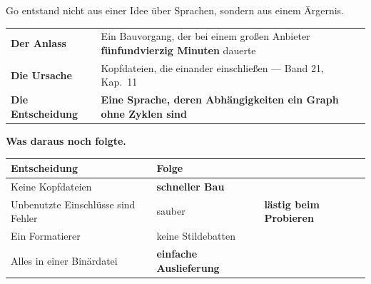 \begin{geschichte}
Go entstand nicht aus einer Idee über Sprachen, sondern aus einem Ärgernis.

\begin{center}
\renewcommand{\arraystretch}{1.5}
\begin{tabular}{@{}P{2.6cm}P{6.4cm}@{}}
\toprule
\textbf{Der Anlass} & Ein Bauvorgang, der bei einem großen Anbieter \textbf{fünfundvierzig Minuten} dauerte\\
\textbf{Die Ursache} & Kopfdateien, die einander einschließen --- Band 21, Kap.~11\\
\textbf{Die Entscheidung} & \textbf{Eine Sprache, deren Abhängigkeiten ein Graph ohne Zyklen sind}\\
\bottomrule
\end{tabular}
\end{center}

\begin{center}
\begin{minipage}{0.86\textwidth}
\end{minipage}
\end{center}

\textbf{Was daraus noch folgte.}

\begin{center}
\renewcommand{\arraystretch}{1.5}
\begin{tabular}{@{}P{3.0cm}P{2.4cm}P{2.6cm}@{}}
\toprule
\textbf{Entscheidung} & \textbf{Folge} & \\
\midrule
Keine Kopfdateien & \textcolor{gruen}{\textbf{schneller Bau}} & \\
Unbenutzte Einschlüsse sind Fehler & \textcolor{gruen}{sauber} & \textcolor{akzent}{\textbf{lästig beim Probieren}}\\
Ein Formatierer & \textcolor{gruen}{keine Stildebatten} & \\
Alles in einer Binärdatei & \textcolor{gruen}{\textbf{einfache Auslieferung}} & \\
\bottomrule
\end{tabular}
\end{center}

\begin{center}
\begin{minipage}{0.86\textwidth}
\end{minipage}
\end{center}


\end{geschichte}
